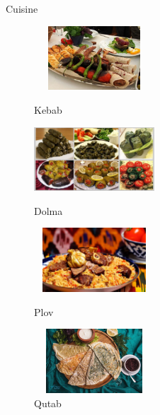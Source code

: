 \documentclass[hyperref={pdfpagemode=FullScreen}]{beamer}
\begin{document}
\begin{frame}{Cuisine}
\begin{figure}
\begin{multicols}{2}
\centering
\includegraphics[width=4.5cm, height=2.4cm]{img/cus01.jpg}
 \caption{Kebab}

\includegraphics[width=4.5cm, height=2.4cm]{img/cus02.jpg}
 \caption{Dolma}
  \columnbreak
 
\includegraphics[width=4.5cm, height=2.4cm]{img/cus03.jpg}
\caption{Plov}

\includegraphics[width=4.5cm, height=2.4cm]{img/cus04.jpg}
\caption{Qutab}
\end{multicols}
\end{figure}
\end{frame}
\end{document}
